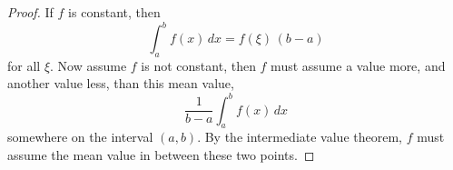 

\begin{proof}
If $f$ is constant, then  
$$
\int_a^b f(x)\,dx = f(\xi)\,(b-a) 
$$
for all $\xi$. Now assume $f$ is not constant, then $f$ must assume 
a value more, and another value less, than this mean value, 
$$
\frac{1}{b-a}\int_a^b f(x)\,dx
$$
somewhere on the interval $(a,b)$. By the intermediate value theorem, 
$f$ must assume the mean value in between these two points.

\end{proof}

